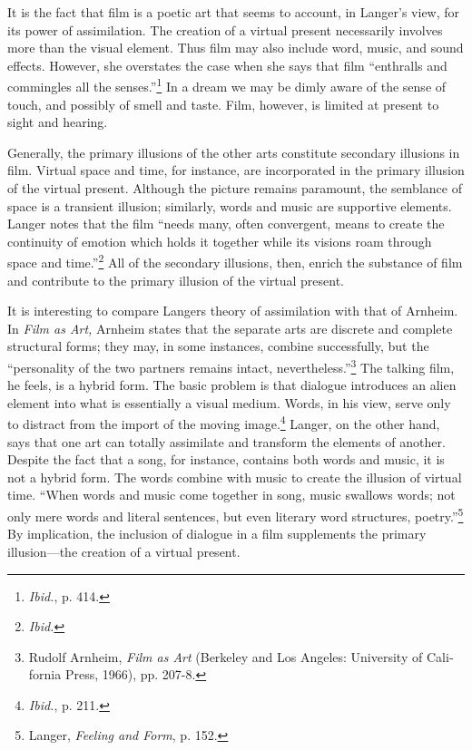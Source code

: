 \documentclass{tufte-handout}
\begin{document}
\noindent It is the fact that film is a poetic art that seems to account, in
Langer's view, for its power of assimilation. The creation of a virtual
present necessarily involves more than the visual element. Thus film may
also include word, music, and sound effects. However, she overstates the
case when she says that film ``enthralls and commingles all the
senses.''\footnote{\emph{Ibid.}, p. 414.} In a dream we may be dimly
aware of the sense of touch, and possibly of smell and taste. Film,
however, is limited at present to sight and hearing.

Generally, the primary illusions of the other arts constitute secondary
illusions in film. Virtual space and time, for instance, are
incorporated in the primary illusion of the virtual present. Although
the picture remains paramount, the semblance of space is a transient
illusion; similarly, words and music are supportive elements. Langer
notes that the film ``needs many, often convergent, means to create the
continuity of emotion which holds it together while its visions roam
through space and time.''\footnote{\emph{Ibid.}} All of the sec­ondary
illusions, then, enrich the substance of film and contribute to the
primary illusion of the virtual present.

It is interesting to compare Langer\textquotesingle s theory of
assimilation with that of Arnheim. In \emph{Film as Art,} Arnheim states
that the separate arts are discrete and complete structural forms; they
may, in some instances, combine suc­cessfully, but the ``personality of
the two partners remains intact, neverthe­less.''\footnote{Rudolf
  Arnheim, \emph{Film as Art} (Berkeley and Los Angeles: University of
  Cali­fornia Press, 1966), pp. 207-8.} The talking film, he feels, is a
hybrid form. The basic problem is that dialogue introduces an alien
element into what is essentially a visual medium. Words, in his view,
serve only to distract from the import of the moving image.\footnote{\emph{Ibid.},
  p. 211.} Langer, on the other hand, says that one art can totally
assimilate and transform the elements of another. Despite the fact that
a song, for instance, contains both words and music, it is not a hybrid
form. The words combine with music to create the illusion of virtual
time. ``When words and music come together in song, music swallows
words; not only mere words and literal sentences, but even literary word
structures, poet­ry.''\footnote{Langer, \emph{Feeling and Form}, p. 152.}
By implication, the inclusion of dialogue in a film supplements the
primary illusion---the creation of a virtual present.
\end{document}

